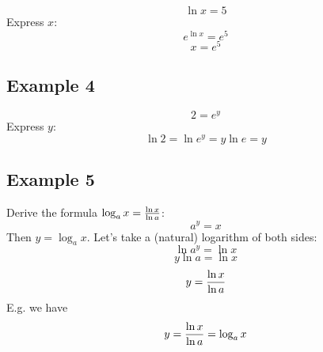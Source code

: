 \documentclass[10pt]{article}
\begin{document}
$$\ln x = 5$$
Express $x$:
$$e^{\ln x} = e^5$$
$$x = e^5$$

\subsection{Example 4}

$$2 = e^y$$
Express $y$:
$$\ln 2 = \ln e^y = y\ln e = y$$

\subsection{Example 5}

Derive the formula $\log_a x = {\ln x\over \ln a}$:
$$a^y = x$$
Then $y = \log_a x$. Let's take a (natural) logarithm of both sides:
$$\ln a^y = \ln x$$
$$y \ln a = \ln x$$
$$y = {\ln x\over\ln a}$$
E.g. we have
$$y = {\ln x\over\ln a} = \log_a x$$
\end{document}
